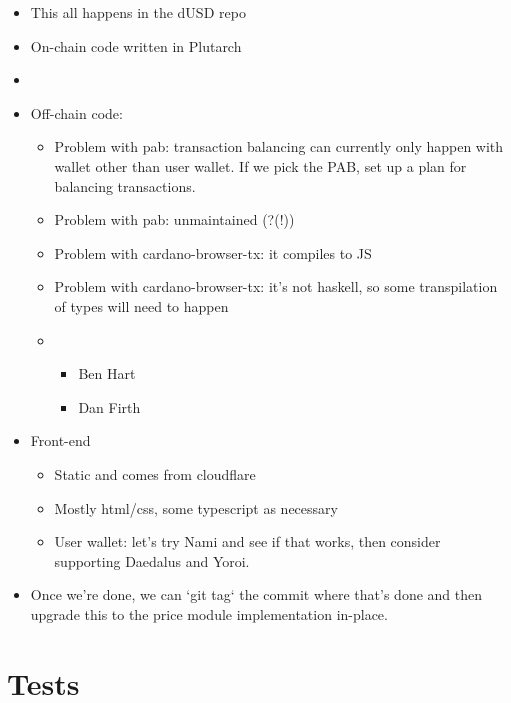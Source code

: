 \documentclass{article}
\begin{document}
\begin{itemize}
  \item This all happens in the dUSD repo
  \item On-chain code written in Plutarch
  \item {}
  \item Off-chain code:
  \begin{itemize}
    \item Problem with pab: transaction balancing can currently only happen with wallet other than user wallet. If we pick the PAB, set up a plan for balancing transactions.
    \item Problem with pab: unmaintained (?(!))
    \item Problem with cardano-browser-tx: it compiles to JS
    \item Problem with cardano-browser-tx: it’s not haskell, so some transpilation of types will need to happen
    \item {}
    \begin{itemize}
      \item Ben Hart
      \item Dan Firth
    \end{itemize}
  \end{itemize}
  \item Front-end
  \begin{itemize}
    \item Static and comes from cloudflare
    \item Mostly html/css, some typescript as necessary
    \item User wallet: let’s try Nami and see if that works, then consider supporting Daedalus and Yoroi.
  \end{itemize}
\item Once we’re done, we can `git tag` the commit where that’s done and then upgrade this to the price module implementation in-place.
\end{itemize}

\section{Tests}
\end{document}
